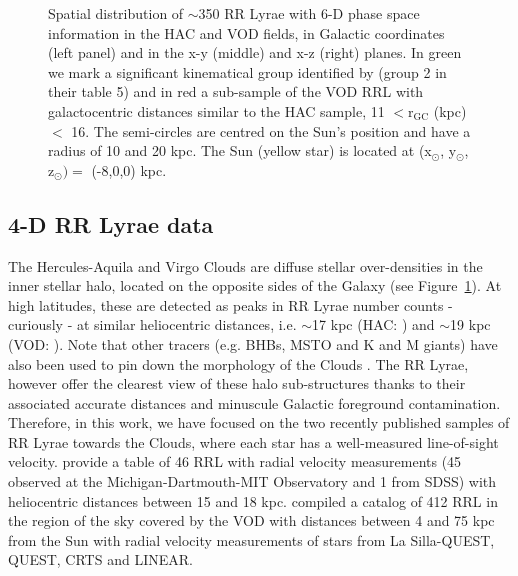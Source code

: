 \documentclass[fleqn,usenatbib]{mnras}
\begin{document}
\begin{figure}
	\vspace{-0.55cm}
    \caption{Spatial distribution of $\sim$350 RR Lyrae with 6-D phase
      space information in the HAC and VOD fields, in Galactic
      coordinates (left panel) and in the x-y (middle) and x-z (right)
      planes. In green we mark a significant kinematical group
      identified by \citet{Vivas2016} (group 2 in their table 5) and
      in red a sub-sample of the VOD RRL with galactocentric distances
      similar to the HAC sample, 11 $<\mathrm{r_{GC}}$ (kpc)$<$
      16. The semi-circles are centred on the Sun's position and have
      a radius of 10 and 20 kpc. The Sun (yellow star) is located at
      (x$_{\odot}$, y$_{\odot}$, z$_{\odot})= $ (-8,0,0) kpc.}
    \label{fig:lb}
\end{figure}
%
\subsection{4-D RR Lyrae data}
%
The Hercules-Aquila and Virgo Clouds are diffuse stellar
over-densities in the inner stellar halo, located on the opposite
sides of the Galaxy (see Figure~\ref{fig:lb}). At high latitudes,
these are detected as peaks in RR Lyrae number counts - curiously - at
similar heliocentric distances, i.e. $\sim$17 kpc (HAC:
\citealt{Wa09,Simion2014}) and $\sim$19 kpc (VOD: \citealt{Vivas2006,
  Duffau2014, Vivas2016}). Note that other tracers (e.g. BHBs, MSTO
and K and M giants) have also been used to pin down the morphology of
the Clouds \citep[see
  e.g.][]{Be07,Juric2008,Sharma2010,Bonaca2012,Conroy2018}. The RR
Lyrae, however offer the clearest view of these halo sub-structures
thanks to their associated accurate distances and minuscule Galactic
foreground contamination. Therefore, in this work, we have focused on
the two recently published samples of RR Lyrae towards the Clouds,
where each star has a well-measured line-of-sight
velocity. \citet{Simion2018} provide a table of 46 RRL with radial
velocity measurements (45 observed at the Michigan-Dartmouth-MIT
Observatory and 1 from SDSS) with heliocentric distances between 15
and 18 kpc. \cite{Vivas2016} compiled a catalog of 412 RRL in the
region of the sky covered by the VOD with distances between 4 and 75
kpc from the Sun with radial velocity measurements of stars from La
Silla-QUEST, QUEST, CRTS and LINEAR.

%
\end{document}
